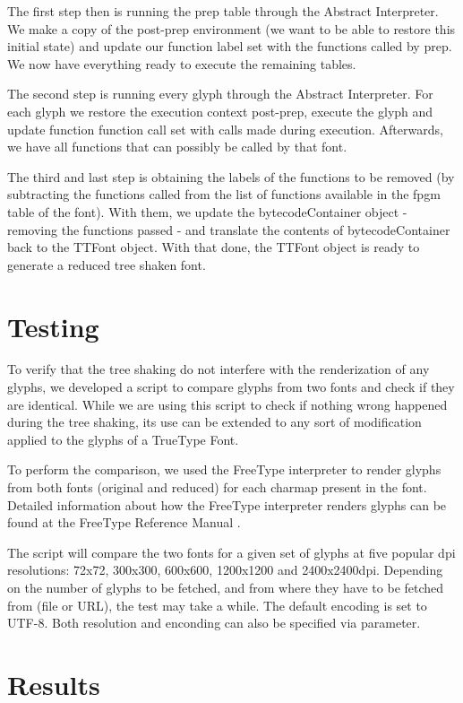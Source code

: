 \documentclass[12pt]{article}
\begin{document}
The first step then is running the prep table through the Abstract 
Interpreter. We make a copy of the post-prep environment (we want to be
able to restore this initial state) and update our function label
set with the functions called by prep. We now have everything ready to
execute the remaining tables.

The second step is running every glyph through the Abstract Interpreter.
For each glyph we restore the execution context post-prep, execute the
glyph and update function function call set with calls made during
execution. Afterwards, we have all functions that can possibly be called
by that font.

The third and last step is obtaining the labels of the functions
to be removed (by subtracting the functions called from the list of
functions available in the fpgm table of the font). With them, we update
the bytecodeContainer object - removing the functions passed - and
translate the contents of bytecodeContainer back to the TTFont object. 
With that done, the TTFont object is ready to generate a reduced
tree shaken font.


\section{Testing}

To verify that the tree shaking do not interfere with the
renderization of any glyphs, we developed a script to compare glyphs
from two fonts and check if they are identical. While we are using this
script to check if nothing wrong happened during the tree shaking, its
use can be extended to any sort of modification applied to the glyphs of
a TrueType Font.

To perform the comparison, we used the FreeType interpreter to render
glyphs from both fonts (original and reduced) for each charmap present
in the font. Detailed information about how the FreeType interpreter
renders glyphs can be found at the FreeType Reference Manual \cite{freetypemanual}. 

The script will compare the two fonts for a given set of glyphs at
five popular dpi resolutions: 72x72, 300x300, 600x600, 1200x1200 and
2400x2400dpi. Depending on the number of glyphs to be fetched, and from
where they have to be fetched from (file or URL), the test may take a
while. The default encoding is set to UTF-8. Both resolution and
enconding can also be specified via parameter.

\section{Results}
\end{document}
